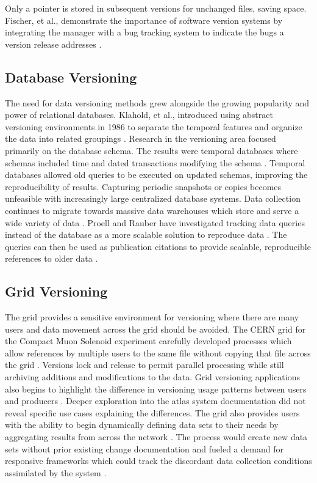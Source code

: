 Only a pointer is stored in subsequent versions for unchanged files, saving space.
Fischer, et al., demonstrate the importance of software version systems by integrating the manager with a bug tracking system to indicate the bugs a version release addresses \cite{Fischer2003}.

\subsection{Database Versioning}

The need for data versioning methods grew alongside the growing popularity and power of relational databases.
Klahold, et al., introduced using abstract versioning environments in 1986 to separate the temporal features and organize the data into related groupings \cite{Klahold:1986:GMV:645913.671314}.
Research in the versioning area focused primarily on the database schema.
The results were temporal databases where schemas included time and dated transactions modifying the schema \cite{roddick1996model}.
Temporal databases allowed old queries to be executed on updated schemas, improving the reproducibility of results.
Capturing periodic snapshots or copies becomes unfeasible with increasingly large centralized database systems.
Data collection continues to migrate towards massive data warehouses which store and serve a wide variety of data \cite{Vassiliadis1999}.
Proell and Rauber have investigated tracking data queries instead of the database as a more scalable solution to reproduce data \cite{proellBigData}.
The queries can then be used as publication citations to provide scalable, reproducible references to older data \cite{Proell2013} \cite{DBLP:conf/data/2013}.

\subsection{Grid Versioning} \label{sec:grid}

The grid provides a sensitive environment for versioning where there are many users and data movement across the grid should be avoided.
The CERN grid for the Compact Muon Solenoid experiment carefully developed processes which allow references by multiple users to the same file without copying that file across the grid \cite{Holtman:687353}.
Versions lock and release to permit parallel processing while still archiving additions and modifications to the data.
Grid versioning applications also begins to highlight the difference in versioning usage patterns between users and producers \cite{Branco2008}.
Deeper exploration into the \gls{atlas} system documentation did not reveal specific use cases explaining the differences.
The grid also provides users with the ability to begin dynamically defining data sets to their needs by aggregating results from across the network \cite{Barkstrom2003a}.
The process would create new data sets without prior existing change documentation and fueled a demand for responsive frameworks which could track the discordant data collection conditions assimilated by the system \cite{Kovse2003VGridAVS}.


